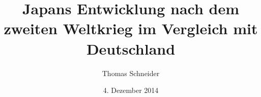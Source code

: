 {
}

{
	\usepackage[left = 2cm, right = 2cm, top = 2cm, bottom=3cm]{geometry}
}

\usepackage{polyglossia}
\setmainlanguage[spelling = new, babelshorthands = true]{german}
\usepackage{fontspec}
\usepackage{hyperref}


\title[Japan, Deutschland: Entwicklung nach dem 2.\,WK]
{Japans Entwicklung nach dem zweiten Weltkrieg im Vergleich mit Deutschland}


\author{Thomas Schneider}

\date{4. Dezember 2014}

\newbox\mytempbox
\newdimen\mytempdimen

\newcommand\includegraphicscopyright[3][]{%
	\leavevmode\vbox{\vskip3pt\raggedright\setbox\mytempbox=\hbox{\texttt{[image: \#2]}}%
		\mytempdimen=\wd\mytempbox\box\mytempbox\par\vskip1pt%
		\fontsize{3}{3.5}\selectfont{\color{black!25}{\vbox{\hsize=\mytempdimen#3}}}\vskip3pt%
	}}